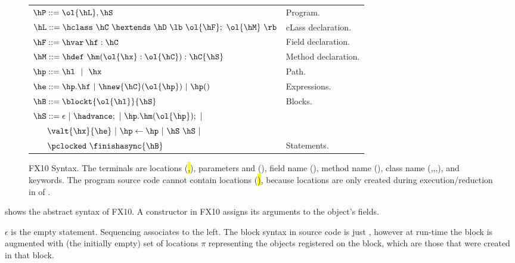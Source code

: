 \begin{figure}[t]
\begin{center}
\begin{tabular}{|l|l|}
\hline

$\hP ::= \ol{\hL},\hS$ & Program. \\

$\hL ::= \hclass ~ \hC~\hextends~\hD~\lb~\ol{\hF};~\ol{\hM}~\rb$
& cLass declaration. \\

$\hF ::= \hvar\,\hf:\hC$
& Field declaration. \\

$\hM ::= \hdef\ \hm(\ol{\hx}:\ol{\hC}):\hC\{\hS\}$
& Method declaration. \\

$\hp ::= \hl ~~|~~ \hx$
& Path. \\ %

$\he ::=  \hp.\hf  ~|~ \hnew{\hC}(\ol{\hp}) ~|~ \hp()$
& Expressions. \\ %
$\hB ::= \blockt{\ol{\hl}}{\hS}$
& Blocks. \\
$\hS ::=  \epsilon ~|~ \hadvance; ~|~ \hp.\hm(\ol{\hp}); ~|~$ &  \\
$~~~~~ \valt{\hx}{\he} ~|~ \hp \leftarrow \hp ~|~ \hS~\hS ~|~  $ &\\
$~~~~~ \pclocked~\finishasync{\hB} $ & Statements. \\ %

\hline
\end{tabular}
\end{center}
FX10 Syntax.
    The terminals are locations (\hl,\ha), parameters and \hthis (\hx), field name (\hf), method name (\hm), class name (\hB,\hC,\hD,\hObject),
        and keywords. %
    The program source code cannot contain locations (\hl), because locations are only created during execution/reduction in  of .

\label{Figure:syntax}
\end{figure}

 shows the abstract syntax of FX10.
A constructor in FX10 assigns its arguments to the object's fields.

$\epsilon$ is the empty statement. Sequencing associates to the left.
The block syntax in source code is just \code{\{\hS\}},
however at run-time the block is augmented with (the initially empty) set of locations
$\pi$ representing the objects registered on the block,
     which are those that were created in that block.

